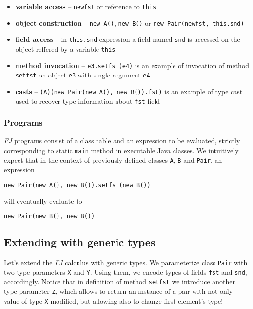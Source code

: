 \documentclass{article}[12pt]
\begin{document}
\begin{itemize}
\item{\textbf{variable access}} -- \texttt{newfst} or reference to
  \texttt{this}
\item{\textbf{object construction}} -- \texttt{new A()},
  \texttt{new B()} or \texttt{new Pair(newfst, this.snd)}
\item{\textbf{field access}} -- in \texttt{this.snd} expression 
  a field named \texttt{snd} is accessed on the object reffered by
  a variable \texttt{this}
\item{\textbf{method invocation}} -- \texttt{e3.setfst(e4)}
  is an example of invocation of method \texttt{setfst} on object
  \texttt{e3} with single argument \texttt{e4}
\item{\textbf{casts}} -- \texttt{(A)(new Pair(new A(), new B()).fst)}
  is an example of type cast used to recover type information about
  \texttt{fst} field
\end{itemize}

\subsubsection{Programs}

\emph{FJ} programs consist of a class table and an expression
to be evaluated, strictly corresponding to static \texttt{main} method in
executable Java classes. We intuitively expect that in the context
of previously defined classes \texttt{A}, \texttt{B} and \texttt{Pair},
an expression

\begin{verbatim}
new Pair(new A(), new B()).setfst(new B())
\end{verbatim}
will eventually evaluate to
\begin{verbatim}
new Pair(new B(), new B())
\end{verbatim}


\subsection{Extending with generic types}

Let's extend the \emph{FJ} calculus with generic types. We parameterize
class \texttt{Pair} with two type parameters \texttt{X} and \texttt{Y}.
Using them, we encode types of fields \texttt{fst} and \texttt{snd},
accordingly. Notice that in definition of method \texttt{setfst} we
introduce another type parameter \texttt{Z}, which allows to return
an instance of a pair with not only value of type \texttt{X} modified,
but allowing also to change first element's type!
\end{document}
